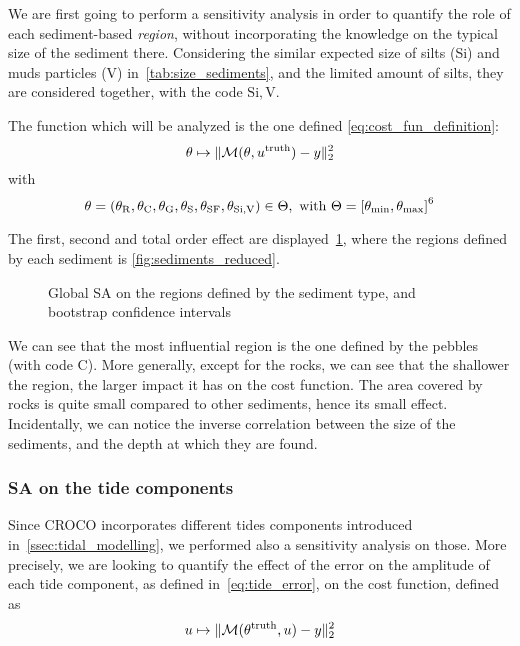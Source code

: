 \documentclass[../../Main_ManuscritThese.tex]{subfiles}
\newcommand{\CROCO}{CROCO}
\newcommand\imgpath{/home/victor/acadwriting/Manuscrit/Text/Chapter5/img/}
\begin{document}
We are first going to perform a sensitivity analysis in order to
quantify the role of each sediment-based \emph{region}, without
incorporating the knowledge on the typical size of the sediment there.
Considering the similar expected size of silts (Si) and muds particles
(V) in~\cref{tab:size_sediments}, and the limited amount of silts,
they are considered together, with the code $\mathrm{Si,V}$.

The function which will be analyzed is the one defined
\cref{eq:cost_fun_definition}:
\begin{equation}
\theta \mapsto \|\mathcal{M}(\theta, u^{\mathrm{truth}}) - y \|_2^2
\end{equation}
with
\begin{equation}
  \kk = (\kk_{\mathrm{R}},\kk_{\mathrm{C}},\kk_{\mathrm{G}},\kk_{\mathrm{S}},
  \kk_{\mathrm{SF}},\kk_{\mathrm{Si,V}})\in\Kspace, \text{ with }
  \Kspace = \interval{\kk_{\min}}{\kk_{\max}}^6
\end{equation}


The first, second and total order effect are
displayed~\cref{fig:SA_sediments}, where the regions defined by each
sediment is \cref{fig:sediments_reduced}. 

\label{ssec:SA_sediments}
\begin{figure}[ht]
  \centering
  
  \caption{\label{fig:SA_sediments} Global SA on the regions defined by the sediment type, and bootstrap confidence intervals}
\end{figure}

We can see that the most influential region is the one defined by the
pebbles (with code C). More generally, except for the rocks, we can
see that the shallower the region, the larger impact it has on the
cost function. The area covered by rocks is quite small compared to
other sediments, hence its small effect. Incidentally, we can notice
the inverse correlation between the size of the sediments, and the
depth at which they are found.


\subsubsection{SA on the tide components}
\label{ssec:SA_tide}

Since \CROCO{} incorporates different tides components introduced
in~\cref{ssec:tidal_modelling}, we performed also a sensitivity
analysis on those. More precisely, we are looking to quantify the
effect of the error on the amplitude of each tide component, as
defined in~\cref{eq:tide_error}, on the cost
function, defined as
\begin{equation}
  u \mapsto  \| \mathcal{M}(\theta^{\mathrm{truth}}, u) - y \|_2^2
\end{equation}
\end{document}
